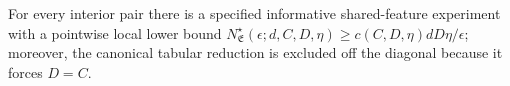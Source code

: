 For every interior pair there is a specified informative shared-feature experiment with a pointwise local lower bound \(N^\star_{\mathfrak E}(\epsilon;d,C,D,\eta)\ge c(C,D,\eta)dD\eta/\epsilon\); moreover, the canonical tabular reduction is excluded off the diagonal because it forces \(D=C\).